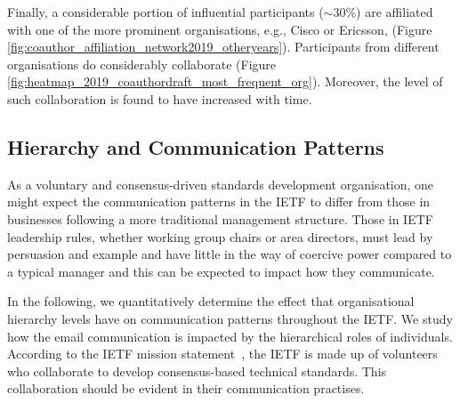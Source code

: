 \documentclass[twocolumn,10pt]{article}
\begin{document}
Finally, a considerable portion of influential participants ($\sim$30\%)
are affiliated with one of the more prominent organisations, e.g., Cisco
or Ericsson, (Figure \ref{fig:coauthor_affiliation_network2019_otheryears}).
Participants from different organisations do considerably collaborate
(Figure \ref{fig:heatmap_2019_coauthordraft_most_frequent_org}). Moreover,
the level of such collaboration is found to have increased with time. 


\subsection{Hierarchy and Communication Patterns}
\label{sec:org-dyn:hierarchy}


As a voluntary and consensus-driven \cite{RFC7282} standards development
organisation, one might expect the communication patterns in the IETF to
differ from those in businesses following a more traditional management
structure. Those in IETF leadership rules, whether working group chairs
or area directors, must lead by persuasion and example and have little in
the way of coercive power compared to a typical manager and this can be
expected to impact how they communicate.

In the following, we quantitatively determine the effect that organisational
hierarchy levels have on communication patterns throughout the IETF. 
We study how the email communication is impacted by the hierarchical roles
of individuals. According to the IETF mission statement~\cite{RFC3935}, the
IETF is made up of volunteers who collaborate to develop consensus-based
technical standards. This collaboration should be evident in their
communication practises.
\end{document}
